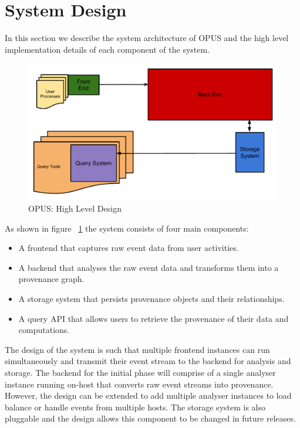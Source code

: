 \documentclass[withindex,glossary]{cam-thesis}
\begin{document}

\section{System Design}
In this section we describe the system architecture of OPUS and the high level implementation details of each component of the system.

\begin{figure}[t!]
  \centering
    \includegraphics[width=1.0\columnwidth]{BroadProvDesign}
  \caption{OPUS: High Level Design}
  \label{fig:opushld}
\end{figure}

As shown in figure ~\ref{fig:opushld} the system consists of four main components:
\begin{itemize}
\item A frontend that captures raw event data from user activities.
\item A backend that analyses the raw event data and transforms them into a provenance graph.
\item A storage system that persists provenance objects and their relationships.
\item A query API that allows users to retrieve the provenance of their data and computations.
\end{itemize} 

The design of the system is such that multiple frontend instances can run simultaneously and transmit their event stream to the backend for analysis and storage.
The backend for the initial phase will comprise of a single analyser instance running on-host that converts raw event streams into provenance.
However, the design can be extended to add multiple analyser instances to load balance or handle events from multiple hosts.
The storage system is also pluggable and the design allows this component to be changed in future releases.
\end{document}
